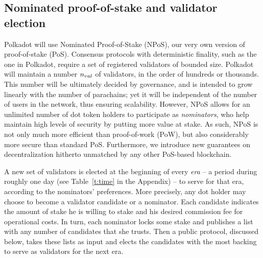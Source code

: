 \subsection{Nominated proof-of-stake and validator election}\label{sec:validators}
Polkadot will use Nominated Proof-of-Stake (NPoS), our very own version of proof-of-stake (PoS).
Consensus protocols with deterministic finality, such as the one in Polkadot, 
require a set of registered validators of bounded size.
Polkadot will maintain a number $n_{val}$ of validators, in the order of hundreds or thousands.
This number will be ultimately decided by governance, and is intended to grow linearly with the number of parachains;
yet it will be independent of the number of users in the network, thus ensuring scalability.
However, NPoS allows for an unlimited number of dot token holders to participate as \emph{nominators},
who help maintain high levels of security by putting more value at stake.
As such, NPoS is not only much more efficient than proof-of-work (PoW),
but also considerably more secure than standard PoS.
Furthermore, we introduce new guarantees on decentralization hitherto unmatched by any other PoS-based blockchain.

A new set of validators is elected at the beginning of every \emph{era} -- a period during roughly one day (see Table~\ref{t:time} in the Appendix) --
to serve for that era, according to the nominators' preferences.
More precisely, any dot holder may choose to become a validator candidate or a nominator.
Each candidate indicates the amount of stake he is willing to stake and his desired commission fee for operational costs.
In turn, each nominator locks some stake and publishes a list with any number of candidates that she trusts.
Then a public protocol, discussed below, takes these lists as input and elects the candidates
with the most backing to serve as validators for the next era.

